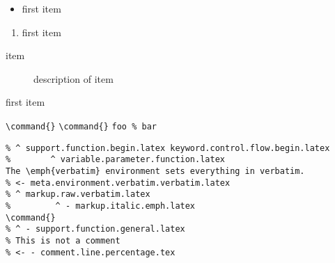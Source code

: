 \documentclass[12pt]{article}
\begin{document}

\footnotemark

\footnotemark  [ 1   ]


\begin{itemize}
\item first item
\end{itemize}

\begin{enumerate}
\item first item
\end{enumerate}

\begin{description}
\item[item] description of item
\end{description}

\begin{list}{()}{}
\item first item
\end{list}


\command{}
\verb|\command{}|
\verb+\command{}+
\verb|foo % bar|


\begin{verbatim}
% ^ support.function.begin.latex keyword.control.flow.begin.latex
%        ^ variable.parameter.function.latex
The \emph{verbatim} environment sets everything in verbatim.
% <- meta.environment.verbatim.verbatim.latex
% ^ markup.raw.verbatim.latex
%         ^ - markup.italic.emph.latex
\command{}
% ^ - support.function.general.latex
% This is not a comment
% <- - comment.line.percentage.tex
\end{verbatim}
\end{document}
